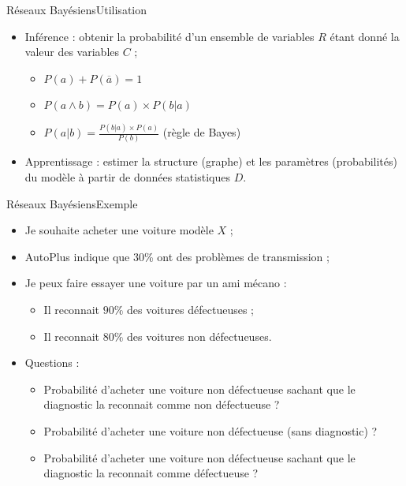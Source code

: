 \documentclass[compress]{beamer}
\begin{document}
\begin{frame}{Réseaux Bayésiens}{Utilisation}
\begin{itemize}
\item Inférence : obtenir la probabilité d'un ensemble de variables $R$
	étant donné la valeur des variables $C$ ;
	\begin{itemize}
	\item $P(a) + P(\overline{a}) = 1$
	\item $P(a \wedge b) = P(a) \times P(b | a)$
	\item $P(a | b) = \frac{P(b | a) \times P(a)}{P(b)}$ (règle de Bayes)
	\end{itemize}
\item Apprentissage : estimer la structure (graphe) et les paramètres (probabilités) du modèle
	à partir de données statistiques $D$.
\end{itemize}
\end{frame}

\begin{frame}{Réseaux Bayésiens}{Exemple}
\begin{itemize}
\item Je souhaite acheter une voiture modèle $X$ ;
\item AutoPlus indique que 30\% ont des problèmes de transmission ;
\item Je peux faire essayer une voiture par un ami mécano :
	\begin{itemize}
	\item Il reconnait $90\%$ des voitures défectueuses ;
	\item Il reconnait $80\%$ des voitures non défectueuses.
	\end{itemize}
\end{itemize}
\begin{itemize}
\item Questions :
	\begin{itemize}
	\item Probabilité d'acheter une voiture non défectueuse
	sachant que le diagnostic la reconnait comme non défectueuse ?
	\item Probabilité d'acheter une voiture non défectueuse (sans diagnostic) ?
	\item Probabilité d'acheter une voiture non défectueuse
	sachant que le diagnostic la reconnait comme défectueuse ?
	\end{itemize}
\end{itemize}
\end{frame}
\end{document}

